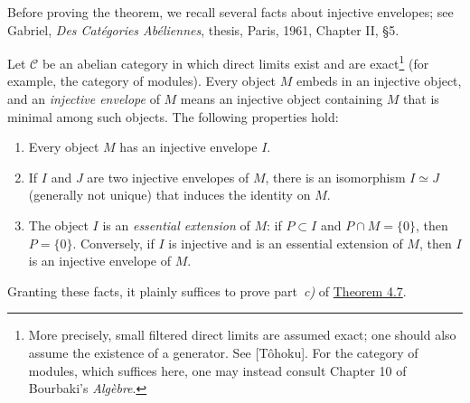 \documentclass[11pt,a4paper,oneside]{book}
\providecommand{\srcpage}[1]{%
  \marginpar{\raggedright\scriptsize\color{gray}Original French p.~#1}}
\providecommand{\Ccat}{\mathcal C}
\theoremstyle{plain}
\theoremstyle{definition}
\theoremstyle{remark}
\begin{document}
Before\srcpage{54} proving the theorem, we recall several facts about injective
envelopes; see Gabriel, \emph{Des Cat\'egories Ab\'eliennes}, thesis,
Paris, 1961, Chapter II, \S5.

Let $\Ccat$ be an abelian category in which direct limits exist and are
exact\footnote{More precisely, small filtered direct limits are assumed
exact; one should also assume the existence of a generator. See
  [T\^ohoku]. For the category of modules, which suffices here, one may
instead consult Chapter 10 of Bourbaki's \emph{Alg\`ebre}.}
(for example, the category of modules). Every object $M$ embeds in an
injective object, and an \emph{injective envelope} of $M$ means an injective
object containing $M$ that is minimal among such objects. The following
properties hold:
\begin{enumerate}[label=\textup{\roman*)},leftmargin=2.7em]
\item Every object $M$ has an injective envelope $I$.
\item If $I$ and $J$ are two injective envelopes of $M$, there is an
isomorphism $I\simeq J$ (generally not unique) that induces the identity on
$M$.
\item The object $I$ is an \emph{essential extension} of $M$: if
$P\subset I$ and $P\cap M=\{0\}$, then $P=\{0\}$. Conversely, if $I$ is
injective and is an essential extension of $M$, then $I$ is an injective
envelope of $M$.
\end{enumerate}

Granting these facts, it plainly suffices to prove part~\emph{c)} of
\hyperref[IV.4.7]{Theorem 4.7}.
\end{document}
